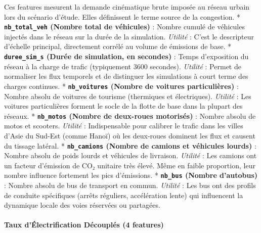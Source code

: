 \documentclass[10pt, a4paper]{article}
\begin{document}
Ces features mesurent la demande cinématique brute imposée au réseau
urbain lors du scénario d'étude. Elles définissent le terme source de la
congestion. * \textbf{\texttt{nb\_total\_veh} (Nombre total de
véhicules)} : Nombre cumulé de véhicules injectés dans le réseau sur la
durée de la simulation. \emph{Utilité} : C'est le descripteur d'échelle
principal, directement corrélé au volume de émissions de base. *
\textbf{\texttt{duree\_sim\_s} (Durée de simulation, en secondes)} :
Temps d'exposition du réseau à la charge de trafic (typiquement 3600
secondes). \emph{Utilité} : Permet de normaliser les flux temporels et
de distinguer les simulations à court terme des charges continues. *
\textbf{\texttt{nb\_voitures} (Nombre de voitures particulières)} :
Nombre absolu de voitures de tourisme (thermiques et électriques).
\emph{Utilité} : Les voitures particulières forment le socle de la
flotte de base dans la plupart des réseaux. * \textbf{\texttt{nb\_motos}
(Nombre de deux-roues motorisés)} : Nombre absolu de motos et scooters.
\emph{Utilité} : Indispensable pour calibrer le trafic dans les villes
d'Asie du Sud-Est (comme Hanoï) où les deux-roues dominent les flux et
causent du tissage latéral. * \textbf{\texttt{nb\_camions} (Nombre de
camions et véhicules lourds)} : Nombre absolu de poids lourds et
véhicules de livraison. \emph{Utilité} : Les camions ont un facteur
d'émission de CO₂ unitaire très élevé. Même en faible proportion, leur
nombre influence fortement les pics d'émissions. *
\textbf{\texttt{nb\_bus} (Nombre d'autobus)} : Nombre absolu de bus de
transport en commun. \emph{Utilité} : Les bus ont des profils de
conduite spécifiques (arrêts réguliers, accélération lente) qui
influencent la dynamique locale des voies réservées ou partagées.

\paragraph{Taux d'Électrification Découplés (4
features)}\label{taux-duxe9lectrification-duxe9coupluxe9s-4-features}
\end{document}
